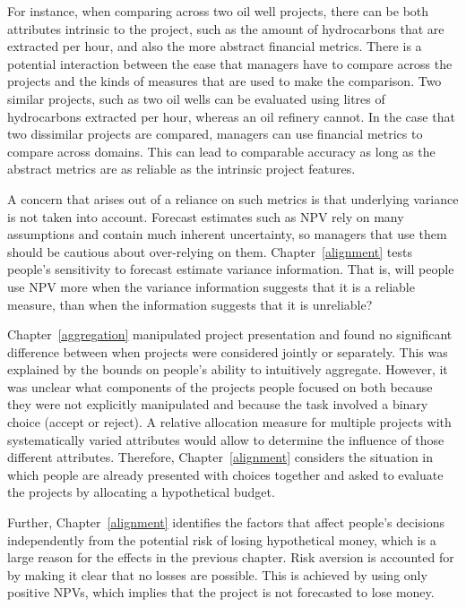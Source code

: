 \documentclass[a4paper, nobind]{templates/ociamthesis}
\theoremstyle{definition}
\theoremstyle{definition}
\theoremstyle{definition}
\theoremstyle{definition}
\theoremstyle{remark}
\begin{document}
For instance, when comparing across two oil well projects, there can be both
attributes intrinsic to the project, such as the amount of hydrocarbons that are
extracted per hour, and also the more abstract financial metrics. There is a
potential interaction between the ease that managers have to compare across the
projects and the kinds of measures that are used to make the comparison. Two
similar projects, such as two oil wells can be evaluated using litres of
hydrocarbons extracted per hour, whereas an oil refinery cannot. In the case
that two dissimilar projects are compared, managers can use financial metrics to
compare across domains. This can lead to comparable accuracy as long as the
abstract metrics are as reliable as the intrinsic project features.

A concern that arises out of a reliance on such metrics is that underlying
variance is not taken into account. Forecast estimates such as NPV rely on many
assumptions and contain much inherent uncertainty, so managers that use them
should be cautious about over-relying on them. Chapter~\ref{alignment} tests
people's sensitivity to forecast estimate variance information. That is, will
people use NPV more when the variance information suggests that it is a reliable
measure, than when the information suggests that it is unreliable?

Chapter~\ref{aggregation} manipulated project presentation and found no
significant difference between when projects were considered jointly or
separately. This was explained by the bounds on people's ability to intuitively
aggregate. However, it was unclear what components of the projects people
focused on both because they were not explicitly manipulated and because the
task involved a binary choice (accept or reject). A relative allocation measure
for multiple projects with systematically varied attributes would allow to
determine the influence of those different attributes. Therefore,
Chapter~\ref{alignment} considers the situation in which people are already
presented with choices together and asked to evaluate the projects by allocating
a hypothetical budget.

Further, Chapter~\ref{alignment} identifies the factors that affect people's
decisions independently from the potential risk of losing hypothetical money,
which is a large reason for the effects in the previous chapter. Risk aversion
is accounted for by making it clear that no losses are possible. This is
achieved by using only positive NPVs, which implies that the project is not
forecasted to lose money.
\end{document}
